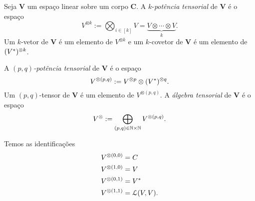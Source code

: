 \begin{definition}
Seja $\bm V$ um espaço linear sobre um corpo $\bm C$. A $k$-\emph{potência tensorial} de $\bm V$ é o espaço
	\begin{equation*}
	V^{\otimes k} := \bigotimes_{i \in [k]} V = \underbrace{V \otimes \cdots \otimes V}_{k}.
	\end{equation*}
Um $k$-vetor de $\bm V$ é um elemento de $V^{\otimes k}$ e um $k$-covetor de $\bm V$ é um elemento de $(V^{\ast})^{\otimes k}$.

A \emph{$(p,q)$-potência tensorial} de $\bm V$ é o espaço
	\begin{equation*}
	V^{\otimes (p,q)} := V^{\otimes p} \otimes (V^{\ast})^{\otimes q}.
	\end{equation*}
Um $(p,q)$-tensor de $\bm V$ é um elemento de $V^{\otimes (p,q)}$. A \emph{álgebra tensorial} de $\bm V$ é o espaço
	\begin{equation*}
	V^{\otimes} := \bigoplus_{(p,q) \in \mathbb{N} \times \mathbb{N}} V^{\otimes (p,q)}.
	\end{equation*}
\end{definition}

Temos as identificações
	\begin{align*}
	V^{\otimes (0,0)} &= C \\
	V^{\otimes (1,0)} &= V \\
	V^{\otimes (0,1)} &= V^{\ast} \\
	V^{\otimes (1,1)} &= \mathcal{L}(V,V). \\
	\end{align*}